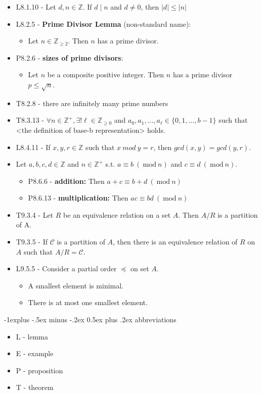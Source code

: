 \documentclass[10pt, landscape]{article}
\makeatletter
\renewcommand{\subsection}{\@startsection{subsection}{2}{0mm}%
                                {-1explus -.5ex minus -.2ex}%
                                {0.5ex plus .2ex}%
                                {\normalfont\normalsize\bfseries}}
\renewcommand{\bf}[1]{\textbf{#1}}
\newcommand{\Mod}[1]{\ \mathrm{mod}\ #1}
\makeatother
\begin{document}
\begin{multicols*}{3}
\begin{itemize}
        \item L8.1.10 - Let $d, n \in \mathbb{Z}$. If $d \mid n$ and $d \neq 0$, then $\vert d \vert \leq \vert n \vert$ 
        \item L8.2.5 - \bf{Prime Divisor Lemma} (non-standard name):
        \begin{itemize}
            \item Let $n \in \mathbb{Z}_{\geq 2}$. Then $n$ has a prime divisor.
        \end{itemize}
        \item P8.2.6 - \bf{sizes of prime divisors}: 
        \begin{itemize}
            \item Let $n$ be a composite positive integer. Then $n$ has a prime divisor $p \leq \sqrt{n}$.
        \end{itemize}
        \item T8.2.8 - there are infinitely many prime numbers
        \item T8.3.13 - $\forall n \in \mathbb{Z}^+, \exists ! \ell \in \mathbb{Z}_{\geq 0}$ and $a_0, a_1, \dots, a_\ell \in \{0, 1, \dots, b - 1\}$ 
        such that <the definition of base-b representation> holds.
        \item L8.4.11 - If $x, y, r \in \mathbb{Z}$ such that $x \ mod \ y = r$, then $gcd(x, y) = gcd(y, r)$.
        \item Let $a, b, c, d \in \mathbb{Z}$ and $n \in \mathbb{Z}^+$ s.t. $a \equiv b \ (\Mod{n})$ and $c \equiv d \ (\Mod{n})$. 
        \begin{itemize}
            \item P8.6.6 - \bf{addition: } Then $a + c \equiv b + d \ (\Mod n)$
            \item P8.6.13 - \bf{multiplication: } Then $ac \equiv bd \ (\Mod n)$
        \end{itemize}
        \item T9.3.4 - Let $R$ be an equivalence relation on a set $A$. Then $A / R$ is a partition of A.
        \item T9.3.5 - If $\mathscr{C}$ is a partition of $A$, then there is an equivalence relation of $R$ on $A$ such that $A/R = \mathscr{C}$.
        \item L9.5.5 - Consider a partial order $\preccurlyeq$ on set $A$. 
        \begin{itemize}
            \item A smallest element is minimal.
            \item There is at most one smallest element.
        \end{itemize}
    \end{itemize}

    \subsection{abbreviations}
    \begin{itemize}
        \item L - lemma
        \item E - example
        \item P - proposition
        \item T - theorem
    \end{itemize}
\end{multicols*}
\end{document}

